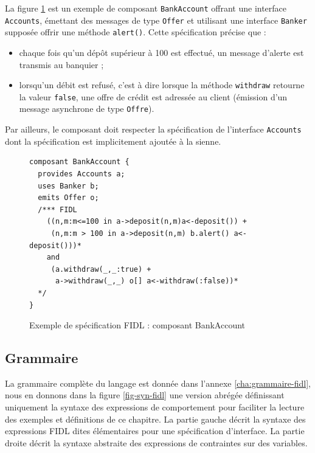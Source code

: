 La figure \ref{fig-excompbkaccount} est un exemple de composant
\texttt{BankAccount} offrant une interface \texttt{Accounts},
\'emettant des messages de type \texttt{Offer} et utilisant une
interface \texttt{Banker} suppos\'ee offrir une m\'ethode
\texttt{alert()}. Cette sp\'ecification pr\'ecise que :
\begin{itemize}
  \item chaque fois qu'un d\'ep\^ot sup\'erieur \`a 100 est effectu\'e, un
  message d'alerte est transmis au banquier ;
\item lorsqu'un d\'ebit est refus\'e, c'est \`a dire lorsque la
  m\'ethode \texttt{withdraw} retourne la valeur
  \texttt{false}, une offre de cr\'edit est adress\'ee au client (\'emission
  d'un message asynchrone de type \texttt{Offre}). 
\end{itemize}

Par ailleurs, le composant doit respecter la sp\'ecification de
l'interface \texttt{Accounts} dont la sp\'ecification est implicitement
ajout\'ee \`a la sienne. 

\begin{figure}[htbp]
    \centering
\begin{lstlisting}
composant BankAccount {
  provides Accounts a;
  uses Banker b;
  emits Offer o;
  /*** FIDL
    ((n,m:m<=100 in a->deposit(n,m)a<-deposit()) +
     (n,m:m > 100 in a->deposit(n,m) b.alert() a<-deposit()))*
    and 
     (a.withdraw(_,_:true) + 
      a->withdraw(_,_) o[] a<-withdraw(:false))*
  */
}
\end{lstlisting}
        \caption{Exemple de sp\'ecification \textsf{FIDL} : composant \textsf{BankAccount}}
    \label{fig-excompbkaccount}
\end{figure}

\subsection{Grammaire}
\label{sec:grammaire}
La grammaire compl\`ete du langage est donn\'ee dans l'annexe
\ref{cha:grammaire-fidl}, nous en donnons dans la figure
\ref{fig-syn-fidl} une version
abr\'eg\'ee d\'efinissant uniquement la syntaxe des expressions de
comportement pour faciliter la lecture des exemples et d\'efinitions
de ce chapitre. La partie gauche d\'ecrit la syntaxe des
expressions \textsf{FIDL} dites \'el\'ementaires pour une sp\'ecification d'interface. La partie droite d\'ecrit la syntaxe abstraite des
expressions de contraintes sur des variables.

